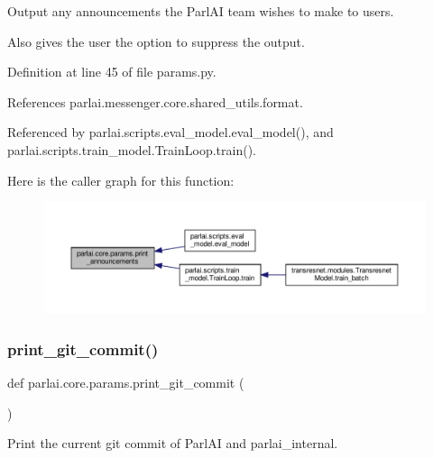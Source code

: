\begin{DoxyVerb}Output any announcements the ParlAI team wishes to make to users.

Also gives the user the option to suppress the output.
\end{DoxyVerb}
 

Definition at line 45 of file params.\+py.



References parlai.\+messenger.\+core.\+shared\+\_\+utils.\+format.



Referenced by parlai.\+scripts.\+eval\+\_\+model.\+eval\+\_\+model(), and parlai.\+scripts.\+train\+\_\+model.\+Train\+Loop.\+train().

Here is the caller graph for this function\+:
\nopagebreak
\begin{figure}[H]
\begin{center}
\leavevmode
\includegraphics[width=350pt]{namespaceparlai_1_1core_1_1params_afd1a47c94990168ea9e70d894a79bd2c_icgraph}
\end{center}
\end{figure}
\mbox{\label{namespaceparlai_1_1core_1_1params_ac8624bf16ab6b2df0f2869f29a92c90b}} 
\subsubsection{\texorpdfstring{print\+\_\+git\+\_\+commit()}{print\_git\_commit()}}
{\footnotesize\ttfamily def parlai.\+core.\+params.\+print\+\_\+git\+\_\+commit (\begin{DoxyParamCaption}{ }\end{DoxyParamCaption})}

\begin{DoxyVerb}Print the current git commit of ParlAI and parlai_internal.\end{DoxyVerb}
 


